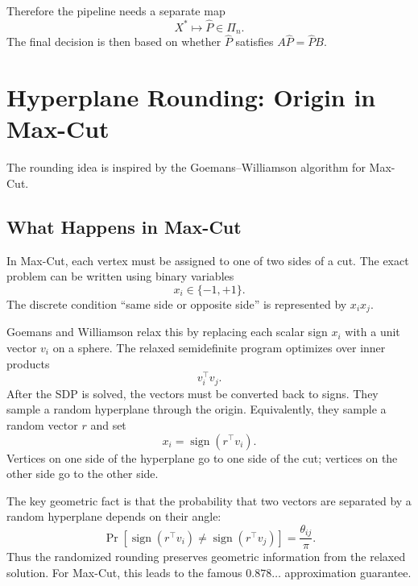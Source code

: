 \documentclass[11pt]{article}
\begin{document}
Therefore the pipeline needs a separate map
\begin{equation}
    X^* \longmapsto \hat P\in\Pi_n.
\end{equation}
The final decision is then based on whether $\hat P$ satisfies $A\hat P=\hat P B$.

\section{Hyperplane Rounding: Origin in Max-Cut}

The rounding idea is inspired by the Goemans--Williamson algorithm for
Max-Cut.

\subsection{What Happens in Max-Cut}

In Max-Cut, each vertex must be assigned to one of two sides of a cut.
The exact problem can be written using binary variables
\begin{equation}
    x_i\in\{-1,+1\}.
\end{equation}
The discrete condition ``same side or opposite side'' is represented by
$x_i x_j$.

Goemans and Williamson relax this by replacing each scalar sign $x_i$ with a
unit vector $v_i$ on a sphere.
The relaxed semidefinite program optimizes over inner products
\begin{equation}
    v_i^\top v_j.
\end{equation}
After the SDP is solved, the vectors must be converted back to signs.
They sample a random hyperplane through the origin.
Equivalently, they sample a random vector $r$ and set
\begin{equation}
    x_i = \operatorname{sign}(r^\top v_i).
\end{equation}
Vertices on one side of the hyperplane go to one side of the cut; vertices on
the other side go to the other side.

The key geometric fact is that the probability that two vectors are separated
by a random hyperplane depends on their angle:
\begin{equation}
    \Pr[\operatorname{sign}(r^\top v_i)\ne \operatorname{sign}(r^\top v_j)]
    =
    \frac{\theta_{ij}}{\pi}.
\end{equation}
Thus the randomized rounding preserves geometric information from the relaxed
solution.
For Max-Cut, this leads to the famous $0.878\ldots$ approximation guarantee.
\end{document}
